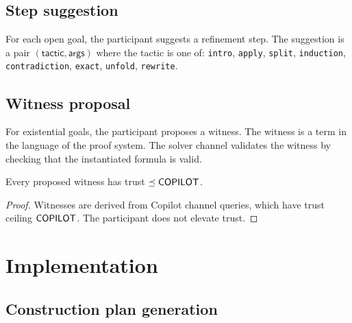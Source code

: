 \documentclass[11pt]{article}
\begin{document}
\subsection{Step suggestion}

For each open goal, the participant suggests a refinement
step.  The suggestion is a pair $(\mathsf{tactic}, \mathsf{args})$
where the tactic is one of: \texttt{intro}, \texttt{apply},
\texttt{split}, \texttt{induction}, \texttt{contradiction},
\texttt{exact}, \texttt{unfold}, \texttt{rewrite}.

\subsection{Witness proposal}

For existential goals, the participant proposes a witness.
The witness is a term in the language of the proof system.
The solver channel validates the witness by checking that
the instantiated formula is valid.

\begin{lemma}\label{lem:witnessceil}
Every proposed witness has trust $\preceq \mathsf{COPILOT}$.
\end{lemma}
\begin{proof}
Witnesses are derived from Copilot channel queries, which
have trust ceiling $\mathsf{COPILOT}$.  The participant does not
elevate trust.
\end{proof}

\section{Implementation}\label{sec:code}

\subsection{Construction plan generation}
\end{document}
